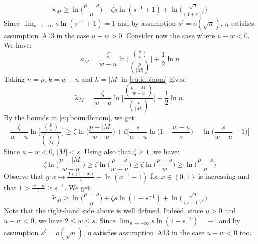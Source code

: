 \documentclass[aos]{imsart}
\theoremstyle{plain}
\begin{document}
\begin{equation}\label{eq:lowerboundb1ebic2}
        \tilde{\kappa}_{M} \geq \ln\big(\frac{p-s}{u}\big)-\zeta s\ln(s^{-1}+1)+ \ln \big(\tfrac{\sqrt{n}}{(1+s)^{\zeta}}\big)
\end{equation}
Since $\lim_{n\to+\infty}s\ln(s^{-1}+1)=1$ and by assumption $s^{\zeta}=o(\sqrt{n})$, $\eta$ satisfies assumption~A13 in the case $u-w>0$.
Consider now the case where $u-w<0$. We have:
     \begin{equation*}
        \tilde{\kappa}_{M}=\frac{\zeta}{w-u}\ln\bigg[\frac{\binom{p}{s}}{\binom{p}{|M|}}\bigg]+ \frac{1}{2}\ln n
    \end{equation*}
 Taking $n=p$, $k=w-u$ and $h=|M|$ in \eqref{eq:idbinom} gives:
     \begin{equation}\label{eq:identitybinom2}
     \tilde{\kappa}_{M}=\frac{\zeta}{w-u}\ln\bigg[\frac{\binom{p - |M|}{w-u}}{\binom{s}{|M|}}\bigg]+ \frac{1}{2}\ln n.
    \end{equation}
By the bounds in \eqref{eq:boundbinom}, we get:
$$ \frac{\zeta}{w-u}\ln\bigg[\frac{\binom{p}{s}}{\binom{p}{|M|}}\bigg] \geq \zeta\ln\bigg(\frac{p-|M|}{w-u}\bigg)+\zeta\bigg[\frac{s}{w-u}\ln\bigg(1-\frac{w-u}{s}\bigg) -\ln\bigg(\frac{s}{w-u}-1\bigg) \bigg]$$
Since $u-w<0$, $|M|<s$. Using also that $\zeta\geq 1$, we have:
$$\zeta\ln\bigg(\frac{p-|M|}{w-u}\bigg) \geq \zeta\ln\bigg(\frac{p-s}{w-u}\bigg) \geq \zeta\ln\bigg(\frac{p-s}{w}\bigg)\geq \ln\bigg(\frac{p-s}{u}\bigg)$$
Observe that $g:x \mapsto \frac{\ln(1-x)}{x}-\ln({x}^{-1}-1)$ for $x\in(0,1)$ is increasing and that $1>\frac{w-u}{s} \geq s^{-1}$. We get: 
\begin{equation}\label{eq:bounbkappaebicunderfit}
        \tilde{\kappa}_{M} \geq \ln\big(\frac{p-s}{u}\big)+\zeta s\ln(1-s^{-1})+ \ln \big(\tfrac{\sqrt{n}}{(s-1)^{\zeta}}\big)
\end{equation}
Note that the right-hand side above is well defined. Indeed, since $u>0$ and $u-w<0$, we have $2\leq w\leq s$. Since $\lim_{n\to+\infty}s\ln(1-s^{-1})=-1$ and by assumption $s^{\zeta}=o(\sqrt{n})$, $\eta$ satisfies assumption~A13 in the case $u-w<0$ too.
\end{document}

